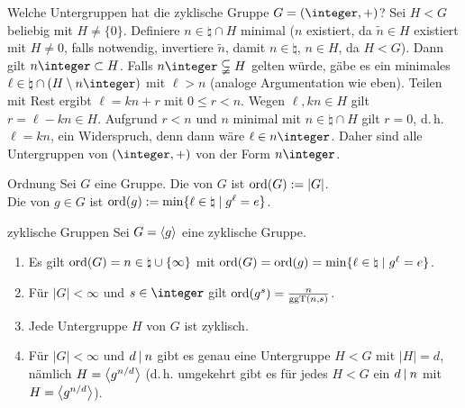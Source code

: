 \begin{Bem}
    Welche Untergruppen hat die zyklische Gruppe $G = (\integer, +)$?
    Sei $H < G$ beliebig mit $H \not= \{0\}$.
    Definiere $n \in \natural \cap H$ minimal
    ($n$ existiert, da $\widetilde{n} \in H$ existiert mit $H \not= 0$,
    falls notwendig, invertiere $\widetilde{n}$, damit $n \in \natural$,
    $n \in H$, da $H < G$).
    Dann gilt $n\integer \subset H$.
    Falls $n\integer \subsetneqq H$ gelten würde, gäbe es ein minimales
    $\ell \in \natural \cap (H \setminus n\integer)$ mit $\ell > n$
    (analoge Argumentation wie eben).
    Teilen mit Rest ergibt $\ell = kn + r$ mit $0 \le r < n$.
    Wegen $\ell, kn \in H$ gilt $r = \ell - kn \in H$.
    Aufgrund $r < n$ und $n$ minimal mit $n \in \natural \cap H$ gilt
    $r = 0$, d.\,h. $\ell = kn$, ein Widerspruch,
    denn dann wäre $\ell \in n\integer$.
    Daher sind alle Untergruppen von $(\integer, +)$ von der Form $n\integer$.
\end{Bem}

\linie

\begin{Def}{Ordnung}
    Sei $G$ eine Gruppe.
    Die  von $G$ ist $\operatorname{ord}(G) := |G|$.\\
    Die  von $g \in G$ ist
    $\operatorname{ord}(g) := \min\{\ell \in \natural \;|\; g^\ell = e\}$.
\end{Def}

\begin{Prop}{zyklische Gruppen}
    Sei $G = \left\langle g\right\rangle$ eine zyklische Gruppe.
    \begin{enumerate}[label=(\alph*)]
        \item
        Es gilt $\operatorname{ord}(G) = n \in \natural \cup \{\infty\}$ mit
        $\operatorname{ord}(G) = \operatorname{ord}(g) = \min\{\ell \in \natural \;|\; g^\ell = e\}$.

        \item
        Für $|G| < \infty$ und $s \in \integer$
        gilt $\operatorname{ord}(g^s) = \frac{n}{\operatorname{ggT}(n, s)}$.

        \item
        Jede Untergruppe $H$ von $G$ ist zyklisch.

        \item
        Für $|G| < \infty$ und $d \mathbin{|} n$ gibt es genau eine Untergruppe
        $H < G$ mit $|H| = d$, nämlich $H = \left\langle g^{n/d}\right\rangle$
        (d.\,h. umgekehrt gibt es für jedes $H < G$ ein $d \mathbin{|} n$ mit
        $H = \left\langle g^{n/d}\right\rangle$).
    \end{enumerate}
\end{Prop}

